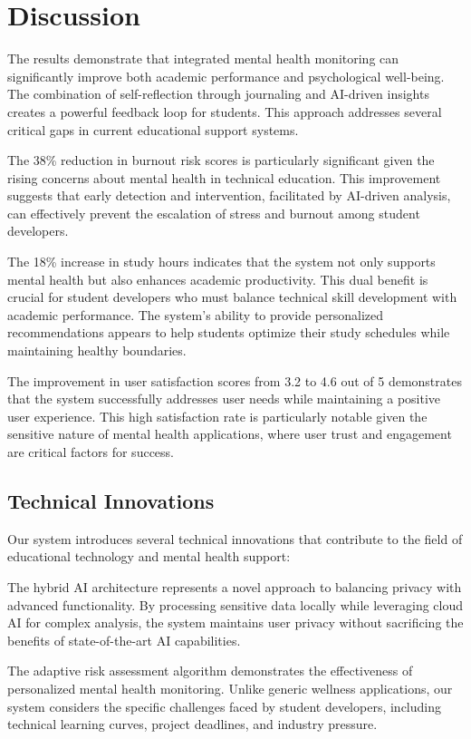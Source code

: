 \documentclass[conference,10pt]{IEEEtran}
\begin{document}
\section{Discussion}

The results demonstrate that integrated mental health monitoring can significantly improve both academic performance and psychological well-being. The combination of self-reflection through journaling and AI-driven insights creates a powerful feedback loop for students. This approach addresses several critical gaps in current educational support systems.

The 38\% reduction in burnout risk scores is particularly significant given the rising concerns about mental health in technical education. This improvement suggests that early detection and intervention, facilitated by AI-driven analysis, can effectively prevent the escalation of stress and burnout among student developers.

The 18\% increase in study hours indicates that the system not only supports mental health but also enhances academic productivity. This dual benefit is crucial for student developers who must balance technical skill development with academic performance. The system's ability to provide personalized recommendations appears to help students optimize their study schedules while maintaining healthy boundaries.

The improvement in user satisfaction scores from 3.2 to 4.6 out of 5 demonstrates that the system successfully addresses user needs while maintaining a positive user experience. This high satisfaction rate is particularly notable given the sensitive nature of mental health applications, where user trust and engagement are critical factors for success.

\subsection{Technical Innovations}

Our system introduces several technical innovations that contribute to the field of educational technology and mental health support:

The hybrid AI architecture represents a novel approach to balancing privacy with advanced functionality. By processing sensitive data locally while leveraging cloud AI for complex analysis, the system maintains user privacy without sacrificing the benefits of state-of-the-art AI capabilities.

The adaptive risk assessment algorithm demonstrates the effectiveness of personalized mental health monitoring. Unlike generic wellness applications, our system considers the specific challenges faced by student developers, including technical learning curves, project deadlines, and industry pressure.
\end{document}
